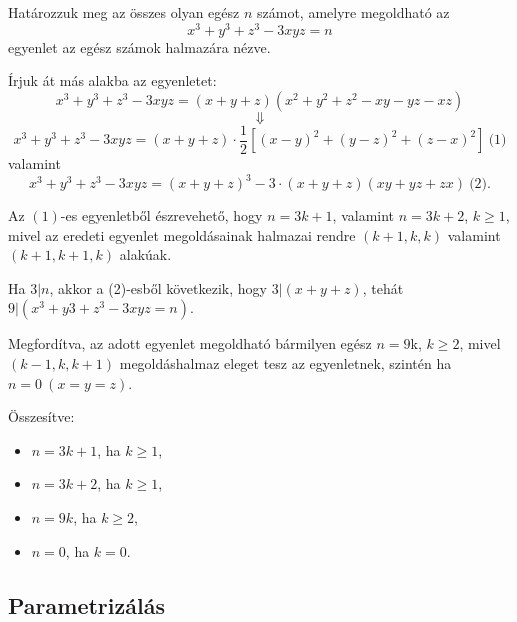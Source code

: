 \begin{problem}
	Határozzuk meg az összes olyan egész $n$ számot,
	amelyre megoldható az 
	\[
	x^{3}+y^{3}+z^{3}-3xyz=n
	\]
	egyenlet az egész számok halmazára nézve.
\end{problem}
\begin{solution}
	Írjuk át más alakba az egyenletet: 
	\[
	x^{3}+y^{3}+z^{3}-3xyz=(x+y+z)(x^{2}+y^{2}+z^{2}-xy-yz-xz)
	\]
	\[
	\Downarrow
	\]
	\[
	x^{3}+y^{3}+z^{3}-3xyz=(x+y+z)\cdot\frac{1}{2}[(x-y)^{2}+(y-z)^{2}+(z-x)^{2}]\ \text{(1)}
	\]
	valamint
	\[
	x^{3}+y^{3}+z^{3}-3xyz=(x+y+z)^{3}-3\cdot(x+y+z)(xy+yz+zx)\ \text{(2)}.
	\]
	
	Az $(1)$-es egyenletből észrevehető, hogy $n=3k+1$, valamint $n=3k+2$,
	$k\geq1$, mivel az eredeti egyenlet megoldásainak halmazai rendre
	$(k+1,k,k)$ valamint $(k+1,k+1,k)$ alakúak. 
	
	Ha $3|n$, akkor a (2)-esből következik, hogy $3|(x+y+z)$, tehát
	$9|(x^{3}+y3+z^{3}-3xyz=n)$. 
	
	Megfordítva, az adott egyenlet megoldható bármilyen egész $n=9$k,
	$k\geq2$, mivel $(k-1,k,k+1)$ megoldáshalmaz eleget tesz az egyenletnek,
	szintén ha $n=0\ (x=y=z)$. 
	
	Összesítve: 
	\begin{itemize}
		\item $n=3k+1$, ha $k\geq1$, 
		\item $n=3k+2$, ha $k\geq1$, 
		\item $n=9k$, ha $k\geq2$, 
		\item $n=0$, ha $k=0$. 
	\end{itemize}
	
\end{solution}

\subsection*{Parametrizálás}

